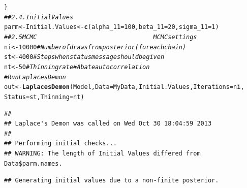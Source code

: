 \documentclass{article}\usepackage[]{graphicx}\usepackage[]{color}
\makeatletter
\newcommand{\hlnum}[1]{\textcolor[rgb]{0.686,0.059,0.569}{#1}}%
\newcommand{\hlcom}[1]{\textcolor[rgb]{0.678,0.584,0.686}{\textit{#1}}}%
\newcommand{\hlstd}[1]{\textcolor[rgb]{0.345,0.345,0.345}{#1}}%
\newcommand{\hlkwb}[1]{\textcolor[rgb]{0.69,0.353,0.396}{#1}}%
\newcommand{\hlkwc}[1]{\textcolor[rgb]{0.333,0.667,0.333}{#1}}%
\newcommand{\hlkwd}[1]{\textcolor[rgb]{0.737,0.353,0.396}{\textbf{#1}}}%
\newenvironment{kframe}{%
 \def\at@end@of@kframe{}%
 \ifinner\ifhmode%
  \def\at@end@of@kframe{\end{minipage}}%
  \begin{minipage}{\columnwidth}%
 \fi\fi%
 \def\FrameCommand##1{\hskip\@totalleftmargin \hskip-\fboxsep
 \colorbox{shadecolor}{##1}\hskip-\fboxsep
     \hskip-\linewidth \hskip-\@totalleftmargin \hskip\columnwidth}%
 \MakeFramed {\advance\hsize-\width
   \@totalleftmargin\z@ \linewidth\hsize
   \@setminipage}}%
 {\par\unskip\endMakeFramed%
 \at@end@of@kframe}
\newenvironment{knitrout}{}{} %
\makeatother
\begin{document}
\begin{knitrout}
\begin{kframe}
\begin{alltt}
\hlstd{\}}
\hlcom{## 2.4. Initial Values~~~~~~~~~~~~~~}
\hlstd{parm} \hlkwb{<-} \hlstd{Initial.Values} \hlkwb{<-} \hlkwd{c}\hlstd{(}\hlkwc{alpha_11} \hlstd{=} \hlnum{100}\hlstd{,} \hlkwc{beta_11} \hlstd{=} \hlnum{20}\hlstd{,} \hlkwc{sigma_11} \hlstd{=} \hlnum{1}\hlstd{)}
\hlcom{## 2.5 MCMC ~~~~~~~~~~~~~~~~~~~~~~~~~~~~~~~~ MCMC settings}
\hlstd{ni} \hlkwb{<-} \hlnum{10000}  \hlcom{# Number of draws from posterior (for each chain)}
\hlstd{st} \hlkwb{<-} \hlnum{4000}  \hlcom{# Steps when status message should be given}
\hlstd{nt} \hlkwb{<-} \hlnum{50}  \hlcom{# Thinning rate #  Abate autocorrelation}
\hlcom{# Run LaplacesDemon}
\hlstd{out} \hlkwb{<-} \hlkwd{LaplacesDemon}\hlstd{(Model,} \hlkwc{Data} \hlstd{= MyData, Initial.Values,} \hlkwc{Iterations} \hlstd{= ni,}
    \hlkwc{Status} \hlstd{= st,} \hlkwc{Thinning} \hlstd{= nt)}
\end{alltt}
\begin{verbatim}
## 
## Laplace's Demon was called on Wed Oct 30 18:04:59 2013
## 
## Performing initial checks...
## WARNING: The length of Initial Values differed from Data$parm.names.
\end{verbatim}


{\ttfamily\noindent\color{warningcolor}{\#\# Warning: NAs produced}}\begin{verbatim}
## Generating initial values due to a non-finite posterior.
\end{verbatim}



\end{kframe}
\end{knitrout}
\end{document}
